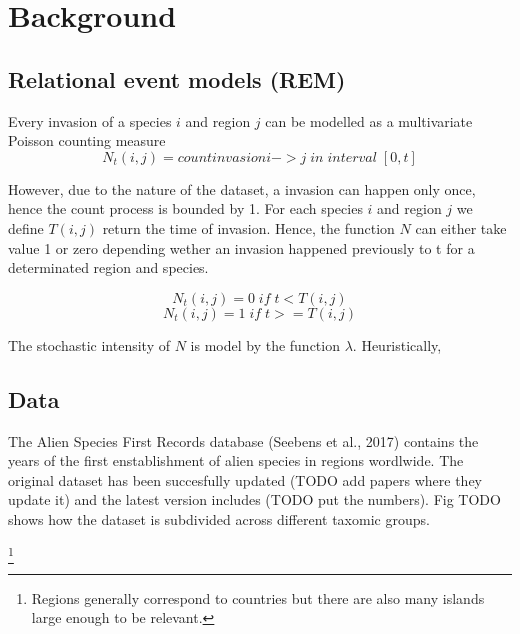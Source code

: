 \documentclass[mscthesis]{usiinfthesis}
\begin{document}

\section{Background}
\subsection{Relational event models (REM)}


Every invasion of a species $i$ and region $j$ can be modelled as a multivariate Poisson counting measure $$N_t(i, j) = count{invasion i -> j \; in \; interval \; [0, t]}$$

However, due to the nature of the dataset, a invasion can happen only once, hence the count process is bounded by 1. For each species $i$ and region $j$ we define $T(i, j)$ return the time of invasion. Hence, the function $N$ can either take value 1 or zero depending wether an invasion happened previously to t for a determinated region and species.

\[
N_t(i, j) = 0 \; if \; t < T(i, j)
\]
\[
N_t(i, j) = 1 \; if \; t >= T(i, j)
\]

The stochastic intensity of $N$ is model by the function $\lambda$. Heuristically, 

\subsection{Data}

The Alien Species First Records database (Seebens et al., 2017) contains the years of the first enstablishment of alien species in regions wordlwide. The original dataset has been succesfully updated (TODO add papers where they update it) and the latest version includes (TODO put the numbers). Fig TODO shows how the dataset is subdivided across different taxomic groups. 


\footnote{Regions generally correspond to countries but there are also many islands large enough to be relevant.}
\end{document}
